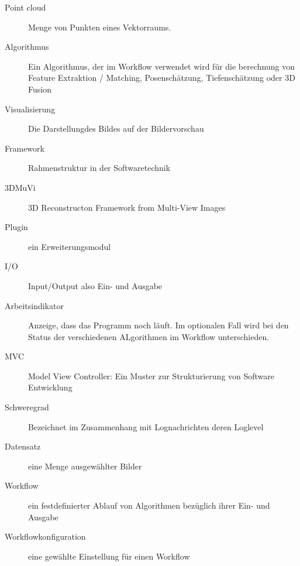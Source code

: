 
\begin{description}
	\item[Point cloud] Menge von Punkten eines Vektorraums.
	\item[Algorithmus] Ein Algorithmus, der im Workflow verwendet wird für die berechnung von Feature Extraktion / Matching, Posenschätzung, Tiefenschätzung oder 3D Fusion
	\item[Visualisierung] Die Darstellungdes Bildes auf der Bildervorschau
	\item[Framework] Rahmenstruktur in der Softwaretechnik 
	\item[3DMuVi] 3D Reconstructon Framework from Multi-View Images
	\item[Plugin] ein Erweiterungsmodul 
	\item[I/O] Input/Output also Ein- und Ausgabe
	\item[Arbeitsindikator] Anzeige, dass das Programm noch läuft. Im optionalen Fall wird bei den Status der verschiedenen ALgorithmen im Workflow unterschieden.
	\item[MVC] Model View Controller: Ein Muster zur Strukturierung von Software Entwicklung
	\item[Schweregrad] Bezeichnet im Zusammenhang mit Lognachrichten deren Loglevel
	\item [Datensatz] eine Menge ausgewählter Bilder
	\item [Workflow] ein festdefinierter Ablauf von Algorithmen bezüglich ihrer Ein- und Ausgabe
	\item [Workflowkonfiguration] eine gewählte Einstellung für einen Workflow
\end{description}

